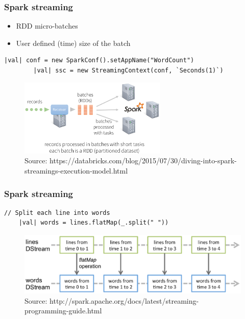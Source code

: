 \documentclass[10pt,utf8]{beamer}
\begin{document}
\begin{frame}[fragile]
	\frametitle{Spark streaming}
	\begin{itemize}
	 \item RDD micro-batches
	 \item User defined (time) size of the batch
	\end{itemize}

	\begin{lstlisting}[style=Java]
		|val| conf = new SparkConf().setAppName("WordCount")
		|val| ssc = new StreamingContext(conf, `Seconds(1)`)
	\end{lstlisting}
	
	\begin{figure}
		\centering
		\includegraphics[width=7cm]{./img/spark-streaming2.eps}
		\caption{\tiny{Source: https://databricks.com/blog/2015/07/30/diving-into-spark-streamings-execution-model.html}}
	\end{figure}
\end{frame}

\begin{frame}[fragile]
	\frametitle{Spark streaming}
	\begin{lstlisting}[style=Java]
    // Split each line into words
    |val| words = lines.flatMap(_.split(" "))
	\end{lstlisting}

	\begin{figure}
		\centering
		\includegraphics[width=12cm]{./img/streaming-dstream-ops.eps}
		\caption{\tiny{Source: http://spark.apache.org/docs/latest/streaming-programming-guide.html}}
	\end{figure}
\end{frame}
\end{document}
